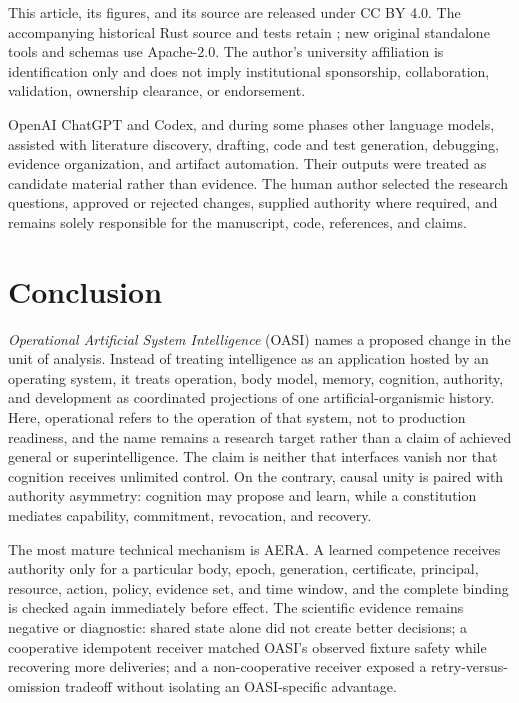 \documentclass[journal,10pt]{IEEEtran}
\newcommand{\OASI}{\textsc{OASI}}
\newcommand{\AERA}{\textsc{AERA}}
\newcommand{\Code}[1]{\texttt{\detokenize{#1}}}
\begin{document}
This article, its figures, and its source are released under CC BY 4.0. The accompanying historical Rust source and tests retain \Code{Apache-2.0 OR MIT}; new original standalone tools and schemas use Apache-2.0. The author's university affiliation is identification only and does not imply institutional sponsorship, collaboration, validation, ownership clearance, or endorsement.

OpenAI ChatGPT and Codex, and during some phases other language models, assisted with literature discovery, drafting, code and test generation, debugging, evidence organization, and artifact automation. Their outputs were treated as candidate material rather than evidence. The human author selected the research questions, approved or rejected changes, supplied authority where required, and remains solely responsible for the manuscript, code, references, and claims.

\section{Conclusion}
\emph{Operational Artificial System Intelligence} (\OASI{}) names a proposed change in the unit of analysis. Instead of treating intelligence as an application hosted by an operating system, it treats operation, body model, memory, cognition, authority, and development as coordinated projections of one artificial-organismic history. Here, operational refers to the operation of that system, not to production readiness, and the name remains a research target rather than a claim of achieved general or superintelligence. The claim is neither that interfaces vanish nor that cognition receives unlimited control. On the contrary, causal unity is paired with authority asymmetry: cognition may propose and learn, while a constitution mediates capability, commitment, revocation, and recovery.

The most mature technical mechanism is \AERA{}. A learned competence receives authority only for a particular body, epoch, generation, certificate, principal, resource, action, policy, evidence set, and time window, and the complete binding is checked again immediately before effect. The scientific evidence remains negative or diagnostic: shared state alone did not create better decisions; a cooperative idempotent receiver matched OASI's observed fixture safety while recovering more deliveries; and a non-cooperative receiver exposed a retry-versus-omission tradeoff without isolating an OASI-specific advantage.
\end{document}
